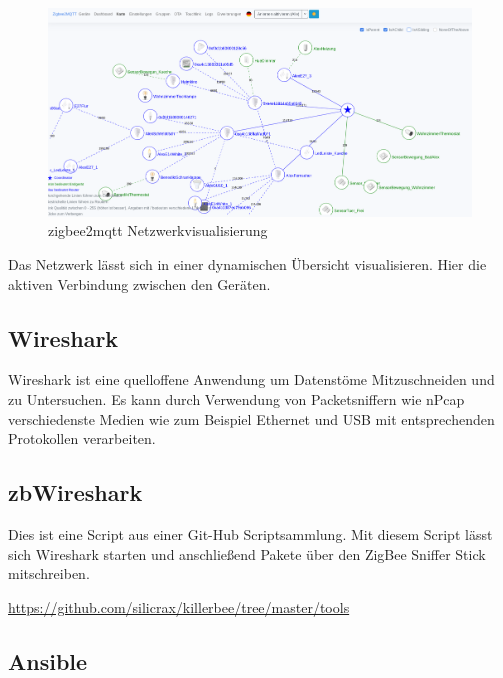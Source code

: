 \begin{figure}[H]
  \centering
  \includegraphics[width=1\textwidth]{media/z2m-map.png}
  \caption{zigbee2mqtt Netzwerkvisualisierung}
\end{figure}

Das Netzwerk lässt sich in einer dynamischen Übersicht visualisieren. Hier die aktiven Verbindung zwischen den Geräten. 

\subsection{Wireshark}

Wireshark ist eine quelloffene Anwendung um Datenstöme Mitzuschneiden und zu Untersuchen. Es kann durch Verwendung
von Packetsniffern wie nPcap verschiedenste Medien wie zum Beispiel Ethernet und USB mit entsprechenden Protokollen
verarbeiten.

\subsection{zbWireshark}

Dies ist eine Script aus einer Git-Hub Scriptsammlung. Mit diesem Script lässt sich Wireshark starten und anschließend Pakete über den 
 ZigBee Sniffer Stick mitschreiben.

\url{https://github.com/silicrax/killerbee/tree/master/tools}

\subsection{Ansible}
